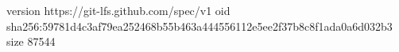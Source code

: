 version https://git-lfs.github.com/spec/v1
oid sha256:59781d4c3af79ea252468b55b463a444556112e5ee2f37b8c8f1ada0a6d032b3
size 87544
